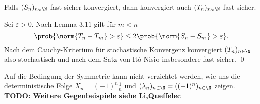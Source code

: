 \begin{theorem}
    Falls $(S_n)_{n \in \N}$ fast sicher konvergiert, dann konvergiert auch $(T_n)_{n \in \N}$ fast sicher. 
\end{theorem}
\begin{proof*}
    Sei $\varepsilon > 0$. Nach Lemma $3.11$ gilt für $m < n$
    $$
        \prob{\norm{T_n - T_m} > \varepsilon} \leq 2\prob{\norm{S_n - S_m} > \varepsilon}. 
    $$
    Nach dem Cauchy-Kriterium für stochastische Konvergenz konvergiert $(T_n)_{n \in \N}$ also stochastisch und nach dem Satz von Itô-Nisio insbesondere fast sicher. \qed
\end{proof*}

\begin{remark}
    Auf die Bedingung der Symmetrie kann nicht verzichtet werden, wie uns die deterministische Folge $X_n = (-1)^n \frac{1}{n}$ und $(\lambda_n)_{n \in \N} = ((-1)^{n})_{n \in \N}$ zeigen. 
    \newline 
    \textbf{TODO: Weitere Gegenbeispiele siehe Li,Queffelec}
\end{remark}
